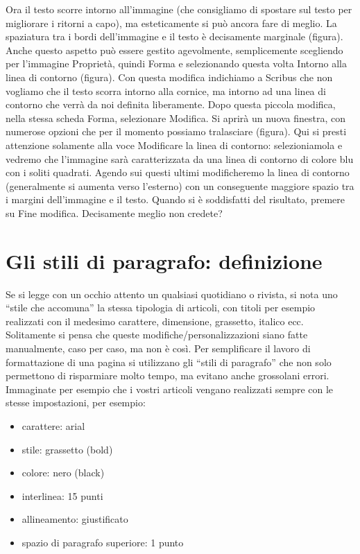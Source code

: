 \documentclass[a4paper, 12pt]{book}
\begin{document}
Ora il testo scorre intorno all'immagine (che consigliamo di spostare sul testo per migliorare i ritorni a capo), ma esteticamente si può ancora fare di meglio. La spaziatura tra i bordi dell'immagine e il testo è decisamente marginale (figura). Anche questo aspetto può essere gestito agevolmente, semplicemente scegliendo per l'immagine Proprietà, quindi Forma e selezionando questa volta Intorno alla linea di contorno (figura). Con questa modifica indichiamo a Scribus che non vogliamo che il testo scorra intorno alla cornice, ma intorno ad una linea di contorno che verrà da noi definita liberamente. Dopo questa piccola modifica, nella stessa scheda Forma, selezionare Modifica. Si aprirà un nuova finestra, con numerose opzioni che per il momento possiamo tralasciare (figura). Qui si presti attenzione solamente alla voce Modificare la linea di contorno: selezioniamola e vedremo che l'immagine sarà caratterizzata da una linea di contorno di colore blu con i soliti quadrati. Agendo sui questi ultimi modificheremo la linea di contorno (generalmente si aumenta verso l'esterno)  con un conseguente maggiore spazio tra i margini dell'immagine e il testo. Quando si è soddisfatti del risultato, premere su Fine modifica. Decisamente meglio non credete?

\section{Gli stili di paragrafo: definizione}
Se si legge con un occhio attento un qualsiasi quotidiano o rivista, si nota uno “stile che accomuna” la stessa tipologia di articoli, con titoli per esempio realizzati con il medesimo carattere, dimensione, grassetto, italico ecc. Solitamente si pensa che queste modifiche/personalizzazioni siano fatte manualmente, caso per caso, ma non è così. Per semplificare il lavoro di formattazione di una pagina si utilizzano gli “stili di paragrafo” che non solo permettono di risparmiare molto tempo, ma evitano anche grossolani errori. Immaginate per esempio che i vostri articoli vengano realizzati sempre con le stesse impostazioni, per esempio:

\begin{itemize}
	\item carattere: arial

	\item stile: grassetto (bold)

	\item colore: nero (black)

	\item interlinea: 15 punti

	\item allineamento: giustificato
	
	\item spazio di paragrafo superiore: 1 punto
\end{itemize}
\end{document}
